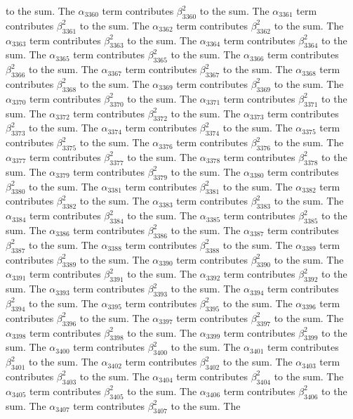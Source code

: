 \begin{lemma}
to the sum. The $\alpha_{3360}$ term contributes $\beta_{3360}^{2}$ to the sum. The $\alpha_{3361}$ term contributes $\beta_{3361}^{2}$ to the sum. The $\alpha_{3362}$ term contributes $\beta_{3362}^{2}$ to the sum. The $\alpha_{3363}$ term contributes $\beta_{3363}^{2}$ to the sum. The $\alpha_{3364}$ term contributes $\beta_{3364}^{2}$ to the sum. The $\alpha_{3365}$ term contributes $\beta_{3365}^{2}$ to the sum. The $\alpha_{3366}$ term contributes $\beta_{3366}^{2}$ to the sum. The $\alpha_{3367}$ term contributes $\beta_{3367}^{2}$ to the sum. The $\alpha_{3368}$ term contributes $\beta_{3368}^{2}$ to the sum. The $\alpha_{3369}$ term contributes $\beta_{3369}^{2}$ to the sum. The $\alpha_{3370}$ term contributes $\beta_{3370}^{2}$ to the sum. The $\alpha_{3371}$ term contributes $\beta_{3371}^{2}$ to the sum. The $\alpha_{3372}$ term contributes $\beta_{3372}^{2}$ to the sum. The $\alpha_{3373}$ term contributes $\beta_{3373}^{2}$ to the sum. The $\alpha_{3374}$ term contributes $\beta_{3374}^{2}$ to the sum. The $\alpha_{3375}$ term contributes $\beta_{3375}^{2}$ to the sum. The $\alpha_{3376}$ term contributes $\beta_{3376}^{2}$ to the sum. The $\alpha_{3377}$ term contributes $\beta_{3377}^{2}$ to the sum. The $\alpha_{3378}$ term contributes $\beta_{3378}^{2}$ to the sum. The $\alpha_{3379}$ term contributes $\beta_{3379}^{2}$ to the sum. The $\alpha_{3380}$ term contributes $\beta_{3380}^{2}$ to the sum. The $\alpha_{3381}$ term contributes $\beta_{3381}^{2}$ to the sum. The $\alpha_{3382}$ term contributes $\beta_{3382}^{2}$ to the sum. The $\alpha_{3383}$ term contributes $\beta_{3383}^{2}$ to the sum. The $\alpha_{3384}$ term contributes $\beta_{3384}^{2}$ to the sum. The $\alpha_{3385}$ term contributes $\beta_{3385}^{2}$ to the sum. The $\alpha_{3386}$ term contributes $\beta_{3386}^{2}$ to the sum. The $\alpha_{3387}$ term contributes $\beta_{3387}^{2}$ to the sum. The $\alpha_{3388}$ term contributes $\beta_{3388}^{2}$ to the sum. The $\alpha_{3389}$ term contributes $\beta_{3389}^{2}$ to the sum. The $\alpha_{3390}$ term contributes $\beta_{3390}^{2}$ to the sum. The $\alpha_{3391}$ term contributes $\beta_{3391}^{2}$ to the sum. The $\alpha_{3392}$ term contributes $\beta_{3392}^{2}$ to the sum. The $\alpha_{3393}$ term contributes $\beta_{3393}^{2}$ to the sum. The $\alpha_{3394}$ term contributes $\beta_{3394}^{2}$ to the sum. The $\alpha_{3395}$ term contributes $\beta_{3395}^{2}$ to the sum. The $\alpha_{3396}$ term contributes $\beta_{3396}^{2}$ to the sum. The $\alpha_{3397}$ term contributes $\beta_{3397}^{2}$ to the sum. The $\alpha_{3398}$ term contributes $\beta_{3398}^{2}$ to the sum. The $\alpha_{3399}$ term contributes $\beta_{3399}^{2}$ to the sum. The $\alpha_{3400}$ term contributes $\beta_{3400}^{2}$ to the sum. The $\alpha_{3401}$ term contributes $\beta_{3401}^{2}$ to the sum. The $\alpha_{3402}$ term contributes $\beta_{3402}^{2}$ to the sum. The $\alpha_{3403}$ term contributes $\beta_{3403}^{2}$ to the sum. The $\alpha_{3404}$ term contributes $\beta_{3404}^{2}$ to the sum. The $\alpha_{3405}$ term contributes $\beta_{3405}^{2}$ to the sum. The $\alpha_{3406}$ term contributes $\beta_{3406}^{2}$ to the sum. The $\alpha_{3407}$ term contributes $\beta_{3407}^{2}$ to the sum. The 
\end{lemma}
